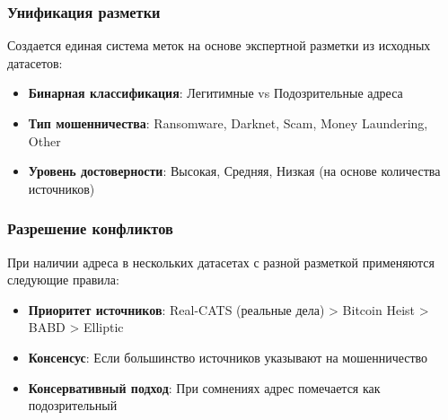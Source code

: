 \subsubsection{Унификация разметки}

Создается единая система меток на основе экспертной разметки из исходных датасетов:

\begin{itemize}
    \item \textbf{Бинарная классификация}: Легитимные vs Подозрительные адреса
    \item \textbf{Тип мошенничества}: Ransomware, Darknet, Scam, Money Laundering, Other
    \item \textbf{Уровень достоверности}: Высокая, Средняя, Низкая (на основе количества источников)
\end{itemize}

\subsubsection{Разрешение конфликтов}

При наличии адреса в нескольких датасетах с разной разметкой применяются следующие правила:

\begin{itemize}
    \item \textbf{Приоритет источников}: Real-CATS (реальные дела) > Bitcoin Heist > BABD > Elliptic
    \item \textbf{Консенсус}: Если большинство источников указывают на мошенничество
    \item \textbf{Консервативный подход}: При сомнениях адрес помечается как подозрительный
\end{itemize}
